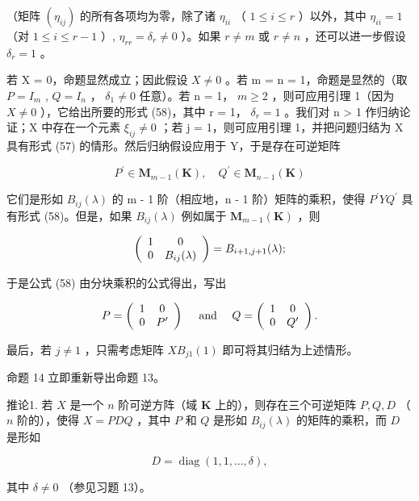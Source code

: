 （矩阵 \((\eta_{ij})\) 的所有各项均为零，除了诸 \(\eta_{ii}\) （ \(1 \leqslant i \leqslant r\) ）以外，其中 \(\eta_{ii} = 1\) （对 \(1 \leqslant i \leqslant r - 1\) ）, \(\eta_{rr} = \delta_r \neq 0\) ）。如果 \(r \neq m\) 或 \(r \neq n\) ，还可以进一步假设 \(\delta_r = 1\) 。

若 X = 0，命题显然成立；因此假设 \(X \neq 0\) 。若 m = n = 1，命题是显然的（取 \(P = I_{m}\) , \(Q = I_{n}\) ， \(\delta_{1} \neq 0\) 任意）。若 n = 1， \(m \geqslant 2\) ，则可应用引理 1（因为 \(X \neq 0\) ），它给出所要的形式 (58)，其中 r = 1， \(\delta_{r} = 1\) 。我们对 n \textgreater{} 1 作归纳论证；X 中存在一个元素 \(\xi_{ij} \neq 0\) ；若 j = 1，则可应用引理 1，并把问题归结为 X 具有形式 (57) 的情形。然后归纳假设应用于 Y，于是存在可逆矩阵

\[
P ^ {\prime} \in \mathbf {M} _ {m - 1} (\mathbf {K}), \quad Q ^ {\prime} \in \mathbf {M} _ {n - 1} (\mathbf {K})
\]

它们是形如 \(B_{ij}(\lambda)\) 的 m - 1 阶（相应地，n - 1 阶）矩阵的乘积，使得 \(P^{\prime}YQ^{\prime}\) 具有形式 (58)。但是，如果 \(B_{ij}(\lambda)\) 例如属于 \(\mathbf{M}_{m-1}(\mathbf{K})\) ，则

\[
\left( \begin{array}{c c} 1 & 0 \\ 0 & B _ {i j} (\lambda) \end{array} \right) = B _ {i + 1, j + 1} (\lambda);
\]

于是公式 (58) 由分块乘积的公式得出，写出

\[
P = \left( \begin{array}{c c} 1 & 0 \\ 0 & P ^ {\prime} \end{array} \right) \quad \text { and } \quad Q = \left( \begin{array}{c c} 1 & 0 \\ 0 & Q ^ {\prime} \end{array} \right).
\]

最后，若 \(j \neq 1\) ，只需考虑矩阵 \(XB_{j1}(1)\) 即可将其归结为上述情形。

命题 14 立即重新导出命题 13。

推论1. 若 \(X\) 是一个 \(n\) 阶可逆方阵（域 \(\mathbf{K}\) 上的），则存在三个可逆矩阵 \(P, Q, D\) （ \(n\) 阶的），使得 \(X = PDQ\) ，其中 \(P\) 和 \(Q\) 是形如 \(B_{ij}(\lambda)\) 的矩阵的乘积，而 \(D\) 是形如

\[
D = \operatorname{diag} (1, 1, \dots , \delta),
\]

其中 \(\delta \neq 0\) （参见习题 13）。

